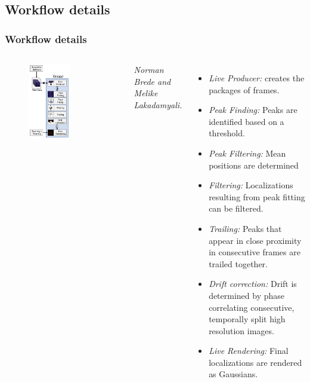 \documentclass[aspectratio=169]{beamer}
\begin{document}
\subsection{Workflow details}
\begin{frame}

\frametitle{Workflow details}

\begin{columns}


    \begin{figure}
    \centering	\includegraphics[trim=0cm 0.5m 0cm 0cm, clip, width=0.6\textwidth]{./images/workflow.pdf} 
    \end{figure} 
    
    \emph{\tiny Norman Brede and Melike Lakadamyali.}


\begin{itemize}
 \item \emph{Live Producer:} creates the  packages of frames. 
 \item \emph{Peak Finding:} Peaks are identified based on a threshold.
 \item \emph{Peak Filtering:} Mean positions are determined
 \item \emph{Filtering:} Localizations resulting from peak fitting can be filtered.
 \item \emph{Trailing:} Peaks that appear in close proximity in consecutive frames are trailed together.
 \item \emph{Drift correction:} Drift is determined by phase correlating consecutive, temporally split high resolution images.
 \item \emph{Live Rendering:} Final localizations are rendered as Gaussians.
\end{itemize}    
    

\end{columns}
\end{frame}
\end{document}
